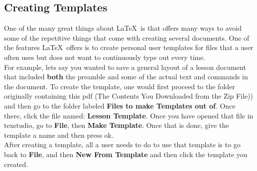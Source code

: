 	\subsection{Creating Templates}
		One of the many great things about \LaTeX\ is that offers many ways to avoid some of the repetitive things that come with creating several documents. One of the features \LaTeX\ offers is to create personal user templates for files that a user often uses but does not want to continuously type out every time.\\
		For example, lets say you wanted to save a general layout of a lesson document that included \textbf{both} the preamble and some of the actual text and commands in the document. 
		To create the template, one would first proceed to the folder originally containing this pdf (The Contents You Downloaded from the Zip File)) and then go to the folder labeled \textbf{Files to make Templates out of}. Once there, click the file named: \textbf{Lesson Template}. Once you have opened that file in texstudio, go to \textbf{File}, then \textbf{Make Template}. Once that is done, give the template a name and then press ok.\\
		After creating a template, all a user needs to do to use that template is to go back to \textbf{File}, and then \textbf{New From Template} and then click the template you created.
	\vspace{-1.5mm}
\newpage